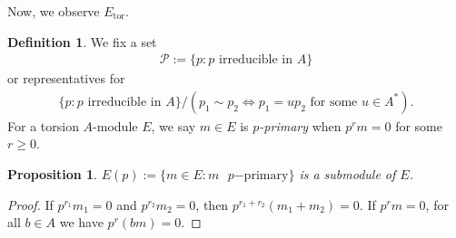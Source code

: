 \documentclass[12pt]{report}
\theoremstyle{plain}
\newtheorem{proposition}[theorem]{Proposition}
\theoremstyle{remark}
\theoremstyle{definition}
\newtheorem{definition}[theorem]{Definition}
\begin{document}
Now, we observe $E_\mathrm{tor}$.

\begin{definition}
    We fix a set
    \begin{align*}
        \mathcal{P} := \{p:p\text{ irreducible in }A\}
    \end{align*}
    or representatives for
    \begin{align*}
        \{p:p\text{ irreducible in }A\}/(p_1\sim p_2 \iff p_1=up_2\text{ for some }u\in A^*).
    \end{align*}
    For a torsion $A$-module $E$, we say $m\in E$ is \emph{$p$-primary} when $p^rm=0$ for some $r\ge0$.
\end{definition}

\begin{proposition}
    $E(p):=\{m\in E:m\text{ }p\mathrm{-primary}\}$ is a submodule of $E$.
\end{proposition}
\begin{proof}
    If $p^{r_1}m_1=0$ and $p^{r_2}m_2=0$, then $p^{r_1+r_2}(m_1+m_2)=0$. If $p^r m=0$, for all $b\in A$ we have $p^r(bm)=0$.
\end{proof}
\end{document}
